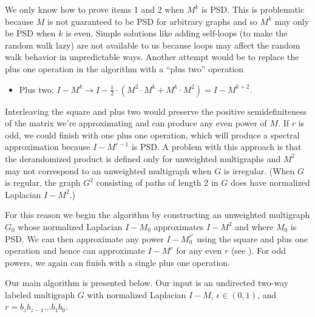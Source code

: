 \documentclass{toc}
\numberwithin{myalgctr}{section}
\theoremstyle{named}
\begin{document}
We only know how to prove items 1 and 2 when $M^k$ is PSD. This is problematic because $M$ is not guaranteed to be PSD for arbitrary graphs and so $M^{k}$ may only be PSD when $k$ is even. Simple solutions like adding self-loops (to make the random walk lazy) are not available to us because loops may affect the random walk behavior in unpredictable ways. Another attempt would be to replace the plus one operation in the algorithm with a ``plus two'' operation
\begin{itemize}
\item Plus two: $I-M^{k} \rightarrow I-\frac{1}{2}\cdot (M^2\cdot M^{k}+ M^{k}\cdot M^2) = I-M^{k+2}$.
\end{itemize}
Interleaving the square and plus two would preserve the positive semidefiniteness of the matrix we're approximating and can produce any even power of $M$. If $r$ is odd, we could finish with one plus one operation, which will produce a spectral approximation because $I-M^{r-1}$ is PSD. A problem with this approach is that the derandomized product is defined only for unweighted multigraphs and $M^2$ may not correspond to an unweighted multigraph when $G$ is irregular. (When $G$ is regular, the graph $G^2$ consisting of paths of length 2 in $G$ does have normalized Laplacian $I-M^2$.)

For this reason we begin the algorithm by constructing an unweighted multigraph $G_0$ whose normalized Laplacian $I-M_0$ approximates $I-M^2$ and where $M_0$ is PSD. We can then approximate any power $I-M_0^{r'}$ using the square and plus one operation and hence can approximate $I-M^r$ for any even $r$ (see ). For odd powers, we again can finish with a single plus one operation. 

Our main algorithm is presented below. Our input is an undirected two-way labeled multigraph $G$ with normalized Laplacian $I-M$, $\epsilon\in(0,1)$, and $r=b_zb_{z-1}\ldots b_1b_0$.
\end{document}
